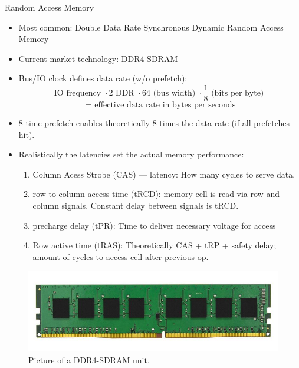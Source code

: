 \documentclass[10pt]{beamer}
\begin{document}
\begin{frame}[allowframebreaks]{Random Access Memory}
\begin{itemize}
 \item Most common: Double Data Rate Synchronous Dynamic Random Access Memory
 \item Current market technology: DDR4-SDRAM
 \item Bus/IO clock defines data rate (w/o prefetch): 
     \[ \text{IO frequency } \cdot 2 \text{ DDR } \cdot 64 \text{ (bus width) } \cdot \frac{1}{8}\text{ (bits per byte) } \] 
        \[= \text{ effective data rate in bytes per seconds} \]
 \item  8-time prefetch enables theoretically 8 times the data rate (if all prefetches hit). 
 \framebreak
 \item Realistically the latencies set the actual memory performance:
 \begin{enumerate}
  \item Column Acess Strobe (CAS) --- latency: How many cycles to serve data.
  \item row to column access time (tRCD): memory cell is read via row and column signals. Constant delay between signals is tRCD.
  \item precharge delay (tPR): Time to deliver necessary voltage for access
  \item Row active time (tRAS): Theoretically CAS + tRP + safety delay; amount of cycles to access cell after previous op.
 \end{enumerate}
\end{itemize}
\framebreak
\begin{figure}
       \begin{center}
       \includegraphics[keepaspectratio, width=\textwidth,height=0.9\textheight-4\baselineskip]{img/206_ddr4-ram.jpg}
      \end{center}
      \caption{Picture of a DDR4-SDRAM unit.~\autocite{store}}
      \end{figure}
\end{frame}
\end{document}
